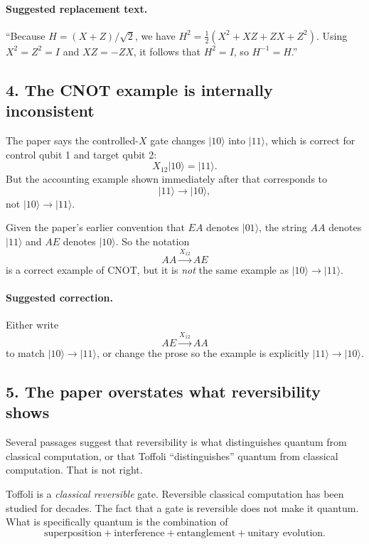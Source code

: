 \documentclass[11pt]{article}
\begin{document}
\paragraph{Suggested replacement text.}
``Because \(H=(X+Z)/\sqrt2\), we have \(H^2=\tfrac12(X^2+XZ+ZX+Z^2)\). Using \(X^2=Z^2=I\) and \(XZ=-ZX\), it follows that \(H^2=I\), so \(H^{-1}=H\).''

\subsection*{4. The CNOT example is internally inconsistent}

The paper says the controlled-\(X\) gate changes \(|10\rangle\) into \(|11\rangle\), which is correct for control qubit 1 and target qubit 2:
\[
X_{12}|10\rangle=|11\rangle.
\]
But the accounting example shown immediately after that corresponds to
\[
|11\rangle \to |10\rangle,
\]
not \(|10\rangle \to |11\rangle\).

Given the paper's earlier convention that \(EA\) denotes \(|01\rangle\), the string \(AA\) denotes \(|11\rangle\) and \(AE\) denotes \(|10\rangle\). So the notation
\[
AA \xrightarrow{X_{12}} AE
\]
is a correct example of CNOT, but it is \emph{not} the same example as \(|10\rangle \to |11\rangle\).

\paragraph{Suggested correction.}
Either write
\[
AE \xrightarrow{X_{12}} AA
\]
to match \(|10\rangle \to |11\rangle\), or change the prose so the example is explicitly \(|11\rangle \to |10\rangle\).

\subsection*{5. The paper overstates what reversibility shows}

Several passages suggest that reversibility is what distinguishes quantum from classical computation, or that Toffoli ``distinguishes'' quantum from classical computation. That is not right.

Toffoli is a \emph{classical reversible} gate. Reversible classical computation has been studied for decades. The fact that a gate is reversible does not make it quantum. What is specifically quantum is the combination of
\[
\text{superposition} + \text{interference} + \text{entanglement} + \text{unitary evolution}.
\]
\end{document}
